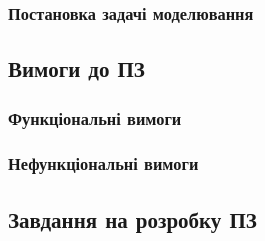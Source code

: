 \subsubsection{Постановка задачі моделювання}

\subsection{Вимоги до ПЗ}
\subsubsection{Функціональні вимоги}

\subsubsection{Нефункціональні вимоги}
\subsection{Завдання на розробку ПЗ}
